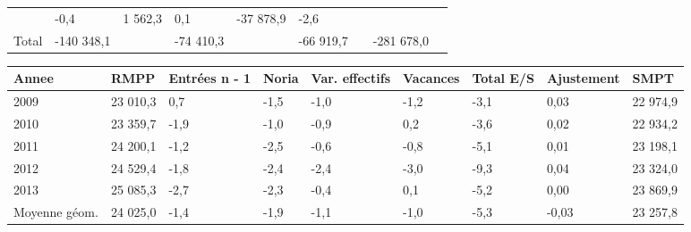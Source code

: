 \begin{longtable}[]{@{}lllllllll@{}}
\begin{minipage}[t]{0.16\columnwidth}
\end{minipage} & \begin{minipage}[t]{0.06\columnwidth}\raggedright
-0,4\strut
\end{minipage} & \begin{minipage}[t]{0.12\columnwidth}\raggedright
1 562,3\strut
\end{minipage} & \begin{minipage}[t]{0.06\columnwidth}\raggedright
0,1\strut
\end{minipage} & \begin{minipage}[t]{0.09\columnwidth}\raggedright
-37 878,9\strut
\end{minipage} & \begin{minipage}[t]{0.06\columnwidth}\raggedright
-2,6\strut
\end{minipage}\tabularnewline
\begin{minipage}[t]{0.05\columnwidth}\raggedright
Total\strut
\end{minipage} & \begin{minipage}[t]{0.10\columnwidth}\raggedright
-140 348,1\strut
\end{minipage} & \begin{minipage}[t]{0.06\columnwidth}\raggedright
\strut
\end{minipage} & \begin{minipage}[t]{0.16\columnwidth}\raggedright
-74 410,3\strut
\end{minipage} & \begin{minipage}[t]{0.06\columnwidth}\raggedright
\strut
\end{minipage} & \begin{minipage}[t]{0.12\columnwidth}\raggedright
-66 919,7\strut
\end{minipage} & \begin{minipage}[t]{0.06\columnwidth}\raggedright
\strut
\end{minipage} & \begin{minipage}[t]{0.09\columnwidth}\raggedright
-281 678,0\strut
\end{minipage} & \begin{minipage}[t]{0.06\columnwidth}\raggedright
\strut
\end{minipage}\tabularnewline
\bottomrule
\end{longtable}

\begin{longtable}[]{@{}lllllllll@{}}
\toprule
Annee & RMPP & Entrées n - 1 & Noria & Var. effectifs & Vacances & Total
E/S & Ajustement & SMPT\tabularnewline
\midrule
\endhead
2009 & 23 010,3 & 0,7 & -1,5 & -1,0 & -1,2 & -3,1 & 0,03 & 22
974,9\tabularnewline
2010 & 23 359,7 & -1,9 & -1,0 & -0,9 & 0,2 & -3,6 & 0,02 & 22
934,2\tabularnewline
2011 & 24 200,1 & -1,2 & -2,5 & -0,6 & -0,8 & -5,1 & 0,01 & 23
198,1\tabularnewline
2012 & 24 529,4 & -1,8 & -2,4 & -2,4 & -3,0 & -9,3 & 0,04 & 23
324,0\tabularnewline
2013 & 25 085,3 & -2,7 & -2,3 & -0,4 & 0,1 & -5,2 & 0,00 & 23
869,9\tabularnewline
Moyenne géom. & 24 025,0 & -1,4 & -1,9 & -1,1 & -1,0 & -5,3 & -0,03 & 23
257,8\tabularnewline
\bottomrule
\end{longtable}

